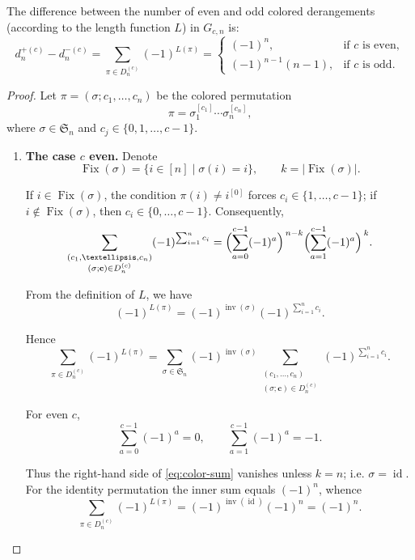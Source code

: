 \documentclass[10pt,a4paper]{amsart}
\begin{document}
\begin{thm}\label{thm:signed-strong-derangements}
The difference between the number of even and odd colored derangements (according to the length function $L$) in $G_{c,n}$ is:
\[
d_{n}^{+(c)}-d_{n}^{-(c)}=\sum_{\pi\in D_n^{(c)}} (-1)^{L(\pi)}
=
\begin{cases}
(-1)^{n}, & \text{if $c$ is even},\\[4pt]
(-1)^{n-1}(n-1), & \text{if $c$ is odd}.
\end{cases}
\]
\end{thm}

\begin{proof}
Let $\pi = (\sigma;c_1,\dots,c_n)$ be the colored permutation
\[\pi=\sigma_1^{[c_1]}\cdots \sigma_n^{[c_n]},\]
where $\sigma\in \mathfrak{S}_n$ and $c_j\in\{0,1,\dots,c-1\}$.  

\medskip
\begin{enumerate}
\item \textbf{The case $c$ even.}
Denote
\[
\operatorname{Fix}(\sigma)=\{i\in[n]\mid \sigma(i)=i\},
\qquad
k=|\operatorname{Fix}(\sigma)|.
\]

If $i\in\operatorname{Fix}(\sigma)$, the condition $\pi(i)\neq i^{[0]}$ forces $c_i\in\{1,\dots,c-1\}$;  
if $i\notin\operatorname{Fix}(\sigma)$, then $c_i\in\{0,\dots,c-1\}$.  
Consequently,
\begin{equation}\label{eq:color-sum}
\sum_{\substack{(c_1,\dots,c_n)\\ (\sigma;\mathbf{c})\in D_n^{(c)}}}
(-1)^{\sum_{i=1}^n c_i}
=
\Bigl(\sum_{a=0}^{c-1}(-1)^a\Bigr)^{\,n-k}
\Bigl(\sum_{a=1}^{c-1}(-1)^a\Bigr)^{\,k}. 
\end{equation}

From the definition of $L$, we have
\[
(-1)^{L(\pi)}=(-1)^{\operatorname{inv}(\sigma)}(-1)^{\sum_{i=1}^n c_i}.
\]

Hence
\[
\sum_{\pi\in D_n^{(c)}}(-1)^{L(\pi)}
=
\sum_{\sigma\in\mathfrak{S}_n}(-1)^{\operatorname{inv}(\sigma)}
\sum_{\substack{(c_1,\dots,c_n)\\ (\sigma;\mathbf{c})\in D_n^{(c)}}}
(-1)^{\sum_{i=1}^n c_i}.
\]

For even $c$,
\[
\sum_{a=0}^{c-1}(-1)^a=0,\qquad
\sum_{a=1}^{c-1}(-1)^a=-1.
\]

Thus the right-hand side of \eqref{eq:color-sum} vanishes unless $k=n$; i.e. $\sigma=\operatorname{id}$.  
For the identity permutation the inner sum equals $(-1)^n$, whence
\[
\sum_{\pi\in D_n^{(c)}}(-1)^{L(\pi)}
=(-1)^{\operatorname{inv}(\operatorname{id})}(-1)^n=(-1)^n.
\]


\end{enumerate}
\end{proof}
\end{document}
